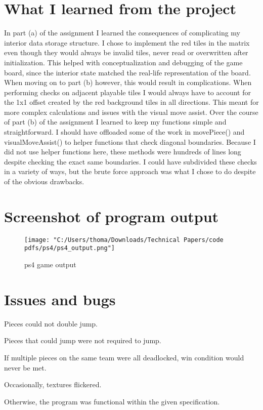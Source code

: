 \documentclass[12pt]{article}
\begin{document}
\section[3]{What I learned from the project}
\hfill\begin{minipage}{\dimexpr\textwidth-1cm}
In part (a) of the assignment I learned the consequences of complicating my interior data storage structure. I chose to implement the red tiles in the matrix even though they would always be invalid tiles, never read or overwritten after initialization. This helped with conceptualization and debugging of the game board, since the interior state matched the real-life representation of the board. When moving on to part (b) however, this would result in complications. When performing checks on adjacent playable tiles I would always have to account for the 1x1 offset created by the red background tiles in all directions. This meant for more complex calculations and issues with the visual move assist.\newline
\newline
Over the course of part (b) of the assignment I learned to keep my functions simple and straightforward. I should have offloaded some of the work in movePiece() and visualMoveAssist() to helper functions that check diagonal boundaries. Because I did not use helper functions here, these methods were hundreds of lines long despite checking the exact same boundaries. I could have subdivided these checks in a variety of ways, but the brute force approach was what I chose to do despite of the obvious drawbacks.
\end{minipage}

\section[4]{Screenshot of program output}
\begin{figure}[H]
  \centering
  \texttt{[image: "C:/Users/thoma/Downloads/Technical Papers/code pdfs/ps4/ps4\_output.png"]}
  \caption{ps4 game output}
  \label{fig:ps4_output}
\end{figure}

\section[5]{Issues and bugs}
\hfill\begin{minipage}{\dimexpr\textwidth-1cm}
\begin{description}
\item Pieces could not double jump.
\item Pieces that could jump were not required to jump.
\item If multiple pieces on the same team were all deadlocked, \newline \newline
win condition would never be met.
\item Occasionally, textures flickered.
\end{description}
Otherwise, the program was functional within the given specification.
\end{minipage}
\end{document}
